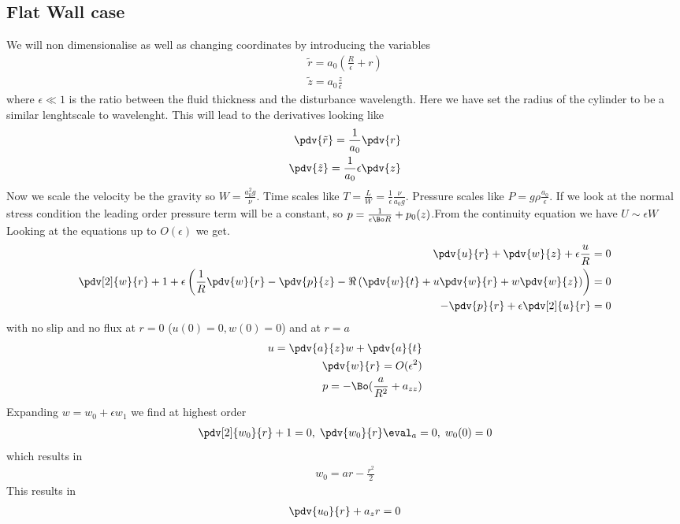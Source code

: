 \documentclass[12pt]{article}
\begin{document}
\subsection{Flat Wall case}

We will non dimensionalise as well as changing coordinates by introducing the variables 
\begin{align}
\tilde r = a_0\left(\frac{R}{\epsilon} +r\right)\\
\tilde z = a_0\frac{ z}{\epsilon}
\end{align}
where $\epsilon\ll 1$ is the ratio between the fluid thickness and the disturbance wavelength. Here we have set the radius of the cylinder to be a similar lenghtscale to wavelenght.
This will lead to the derivatives looking like
\begin{align}
\pdv{\tilde r} = \frac{1}{a_0}\pdv{r}\\
\pdv{\tilde z} =\frac{1}{a_0}\epsilon\pdv{z}
\end{align}
Now we scale the velocity be the gravity so $W = \frac{a_0^2 g}{\nu}$. Time scales like $T = \frac{L}{W} = \frac{1}{\epsilon}\frac{\nu}{a_0 g}$. Pressure scales like $P  =g\rho\frac{a_0}{\epsilon}$. If we look at the normal stress condition the leading order pressure term will be a constant, so $p = \frac{1}{\epsilon \Bo R} + p_0(z)$.From the continuity equation we have $U\sim \epsilon W$
Looking at the equations up to $O(\epsilon)$ we get.
\begin{align}
\pdv{u}{r}+\pdv{w}{z} +\epsilon\frac{u}{R}=0\\
\pdv[2]{w}{r}+1 +\epsilon\left( \frac{1}{R}\pdv{w}{r}-\pdv{p}{z}-\Re\left(\pdv{w}{t}+u\pdv{w}{r}+w\pdv{w}{z}\right)\right)=0\\
-\pdv{p}{r}+\epsilon\pdv[2]{u}{r}=0
\end{align}
with no slip and no flux at $r=0$  ($u(0) = 0, w(0) = 0$)
and at $r = a$
\begin{align}
u = \pdv{a}{z} w + \pdv{a}{t}\\
\pdv{w}{r} = O(\epsilon^2)\\
p = -\Bo(\frac{a}{R^2} +a_{zz})
\end{align}
Expanding $w = w_0+\epsilon w_1$
we find at highest order
\begin{align}
\pdv[2]{w_0}{r}+ 1 = 0, \;\pdv{w_0}{r}\eval_a  = 0, \; w_0(0) = 0
\end{align}
which results in 
\begin{align}
w_0 = ar - \frac{r^2}{2}
\end{align}
This results in 
\begin{align}
\pdv{u_0}{r} + a_z r = 0 
\end{align}
\end{document}
